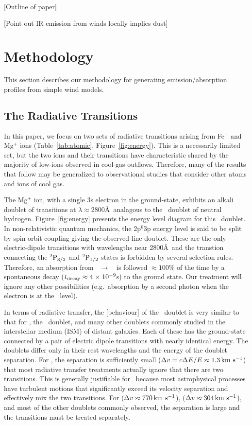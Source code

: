 \documentclass[12pt,preprint]{aastex}
\begin{document}
[Outline of paper]


[Point out IR emission from winds locally implies dust]

\section{Methodology}
\label{sec:method}

This section describes our methodology for generating
emission/absorption profiles from simple wind models.

\subsection{The Radiative Transitions}

In this paper, we focus on two sets of radiative transitions
arising from Fe$^+$ and Mg$^+$ ions
(Table~\ref{tab:atomic}, Figure~\ref{fig:energy}).
This is a necessarily limited
set, but the two ions and their transitions have characteristic
shared by the majority of low-ions 
observed in cool-gas outflows. Therefore, many
of the results that follow may be generalized to observational studies that
consider other atoms and ions of cool gas.

The Mg$^+$ ion, with a single 3s electron in the ground-state,
exhibits an alkali doublet of transitions at $\lambda \approx
2800$\AA\ analagous to the
\lya\ doublet of neutral hydrogen.  Figure~\ref{fig:energy}
presents the energy level diagram for this 
\mgiid\ doublet.  In non-relativistic quantum
mechanics, the 2p$^6$3p energy level is said to be split by spin-orbit
coupling giving the observed line doublet.  These are the only
 electric-dipole transitions 
with wavelengths near 2800\AA\ and the transtion connecting
the $\rm {}^2P_{3/2}$ and $\rm {}^2P_{1/2}$ states is forbidden by several
selection rules.  Therefore, an absorption from
\maconfig~$\to$~\mbconfig\
is followed $\approx 100\%$ of the time by a spontaneous decay
($t_{\rm decay} \approx 4{\; \times \; 10^{-9}}$s) to the
ground state. Our treatment will ignore any other possibilities
(e.g.\ absorption by a second photon when the electron is at the \mbconfig\ level).

In terms of radiative transfer, the [behaviour]
of the \mgiid\ doublet
is very similar to that for 
\lya, the \naid\ doublet, and many other doublets commonly
studied in the interstellar medium (ISM) of distant galaxies.  
Each of these has the ground-state connected by a pair of electric
dipole transitions with nearly identical energy.
The doublets differ only in 
their rest wavelengths and the energy of the doublet separation. 
For \ion{H}{1} \lya, the
separation is sufficiently small ($\Delta v = c \Delta E / E \approx
1.3 \, {\rm km~s^{-1}}$) that most radiative transfer treatments actually ignore that
there are two transitions.   This is generally justifiable for \lya\ because 
most astrophysical processes have turbulent motions that
significantly exceed its velocity separation and effectively mix the
two transitions.  For \ion{Mg}{2} ($\Delta v \approx 770 \, {\rm km~s^{-1}}$),  
\ion{Na}{1} ($\Delta v \approx 304 \, {\rm km~s^{-1}}$), and most of the other doublets
commonly observed, the separation is large and the transitions
must be treated separately.  
\end{document}
